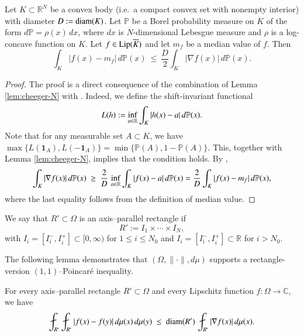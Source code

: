 \documentclass[12pt]{amsart}
\begin{document}
\begin{lemma}\label{lem:L1Poincare-N}
Let $K\subset\mathbb{R}^N$ be a convex body (i.e.\ a compact convex set with nonempty interior) with diameter $D:={\rm diam}(K)$.
Let $\mathbb{P}$ be a Borel probability measure on $K$ of the form $d\mathbb{P}=\rho(x)\,dx$, where $dx$ is $N$-dimensional
Lebesgue measure and $\rho$ is a log-concave function on $K$. Let $f\in {\rm Lip}(\overline K)$ and let $m_f$ be a median value of $f$.
Then
\[
\int_K |f(x)-m_f|\,d\mathbb{P}(x) \ \le\ \frac{D}{2}\int_K |\nabla f(x)|\,d\mathbb{P}(x).
\]
\end{lemma}
\begin{proof}
The proof is a direct consequence of the combination of Lemma \ref{lem:cheeger-N} with \cite[Theorem~1.1]{MR1396954}. Indeed, we define the shift-invariant functional
\[
L(h):=\inf_{a\in\mathbb{R}}\int_K |h(x)-a|\,d\mathbb{P}(x).
\]
Note that for any measurable set $A\subset K$, we have $\max\{L(\mathbf 1_A),L(-\mathbf 1_A)\}=\min\{\mathbb{P}(A),1-\mathbb{P}(A)\}.$ This, together with Lemma \ref{lem:cheeger-N}, implies that the condition \cite[(1.8)]{MR1396954} holds. By \cite[Theorem~1.1]{MR1396954},
\begin{equation}\label{eq:BH-applied}
\int_K |\nabla f(x)|\,d\mathbb{P}(x) \ \ge\ \frac{2}{D}\,\inf_{a\in\R}\int_K |f(x)-a|\,d\mathbb{P}(x) =\frac{2}{D}\int_K |f(x) -m_f|\,d\mathbb{P}(x) ,
\end{equation}
where the last equality follows from the definition of median value.
\end{proof}

\begin{definition}
We say that $R'\subset\Omega$ is an axis--parallel rectangle if
\[
R' := I_1\times\cdots\times I_N,
\]
with $I_i=[I_i^-,I_i^+]\subset[0,\infty)$ for $1\le i\le N_{0}$ and $I_i=[I_i^-,I_i^+]\subset\mathbb{R}$ for $i>N_{0}$.
\end{definition}

The following lemma  demonstrates that  $(\Omega,\|\cdot\|,d\mu)$ supports a rectangle-version $(1,1)$--Poincar\'e inequality.
\begin{lemma}\label{lem:reducePoincare}
For every axis--parallel rectangle $R'\subset\Omega$  and every Lipschitz function $f:\Omega\to\mathbb{C}$, we have
\[
\fint_{R'}\fint_{R'} |f(x)-f(y)|\,d\mu(x)\,d\mu(y)
\ \le\ {\rm diam}(R')\,\fint_{R'} |\nabla f(x)|\,d\mu(x).
\]
\end{lemma}
\end{document}
